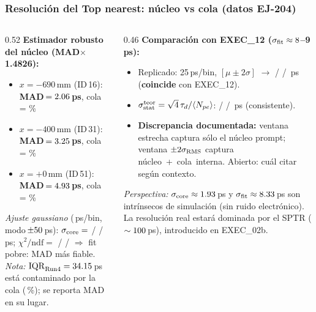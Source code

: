 \documentclass[aspectratio=169]{beamer}
\begin{document}
\begin{frame}
\frametitle{Resoluci\'on del Top nearest: n\'ucleo vs cola (datos EJ-204)}
\small
\begin{columns}
\begin{column}{0.52\textwidth}
\textbf{Estimador robusto del n\'ucleo (MAD$\times$1.4826):}
\vspace{2pt}
{\footnotesize
\begin{itemize}
  \item $x=-690$\,mm (ID\,16): \textbf{MAD\,$=2.06$\,ps},
        cola\,=\,\coreRunOneTailPct\,\%
  \item $x=-400$\,mm (ID\,31): \textbf{MAD\,$=3.25$\,ps},
        cola\,=\,\coreRunThreeTailPct\,\%
  \item $x=+0$\,mm (ID\,51): \textbf{MAD\,$=4.93$\,ps},
        cola\,=\,\coreRunFourTailPct\,\%
\end{itemize}
}
\vspace{2pt}
{\footnotesize\textit{Ajuste gaussiano} (\coreBinPS\,ps/bin, modo\,$\pm50$\,ps):
$\sigma_{\rm core}=$ \coreRunOneSigCore / \coreRunThreeSigCore / \coreRunFourSigCore\,ps;
$\chi^2/\mathrm{ndf}=$ \coreRunOneChiNdf / \coreRunThreeChiNdf / \coreRunFourChiNdf
$\Rightarrow$ fit pobre: MAD m\'as fiable.}\\[3pt]
{\footnotesize\textit{Nota:} $\mathrm{IQR}_{\rm Run4}=34.15$\,ps est\'a contaminado
por la cola (\coreRunFourTailPct\,\%); se reporta MAD en su lugar.}
\end{column}
\begin{column}{0.46\textwidth}
\textbf{Comparaci\'on con EXEC\_12 ($\sigma_{\rm fit}\approx 8$--9\,ps):}
\vspace{2pt}
{\footnotesize
\begin{itemize}
  \item Replicado: 25\,ps/bin, $[\mu\pm2\sigma]$ $\to$
        \coreRunOneSigEx / \coreRunThreeSigEx / \coreRunFourSigEx\,ps
        (\textbf{coincide} con EXEC\_12).
  \item $\sigma_{\rm stat}^{\rm teor}=\sqrt{4}\,\tau_d/\langle N_{pe}\rangle$:
        \coreRunOneSigStat / \coreRunThreeSigStat / \coreRunFourSigStat\,ps
        (consistente).
  \item \textbf{Discrepancia documentada:} ventana estrecha captura
        s\'olo el n\'ucleo prompt; ventana $\pm2\sigma_{\rm RMS}$ captura
        n\'ucleo~+~cola~interna. Abierto: cu\'al citar seg\'un contexto.
\end{itemize}
}
\vspace{3pt}
{\footnotesize\textit{Perspectiva:} $\sigma_{\rm core}\approx1.93$\,ps y
$\sigma_{\rm fit}\approx8.33$\,ps son intr\'insecos de simulaci\'on
(sin ruido electr\'onico). La resoluci\'on real estar\'a dominada por el
SPTR ($\sim100$\,ps), introducido en EXEC\_02b.}
\end{column}
\end{columns}
\end{frame}
\end{document}
